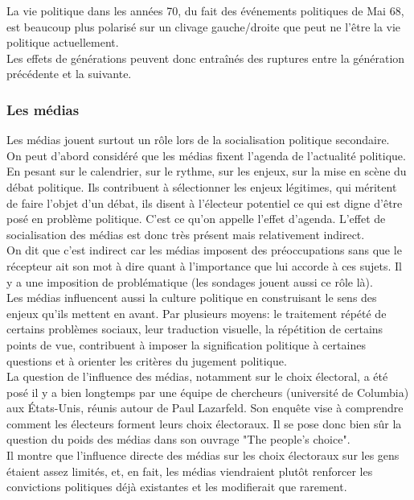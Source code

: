 \documentclass[12pt, a4paper, openany]{book}
\begin{document}
La vie politique dans les années 70, du fait des événements politiques de Mai 68, est beaucoup plus polarisé sur un clivage gauche/droite que peut ne l'être la vie politique actuellement. \\
Les effets de générations peuvent donc entraînés des ruptures entre la génération précédente et la suivante. 

\subsubsection{Les médias}

Les médias jouent surtout un rôle lors de la socialisation politique secondaire. \\
On peut d'abord considéré que les médias fixent l'agenda de l'actualité politique. En pesant sur le calendrier, sur le rythme, sur les enjeux, sur la mise en scène du débat politique. Ils contribuent à sélectionner les enjeux légitimes, qui méritent de faire l'objet d'un débat, ils disent à l'électeur potentiel ce qui est digne d'être posé en problème politique. C'est ce qu'on appelle l'effet d'agenda. L'effet de socialisation des médias est donc très présent mais relativement indirect. \\
On dit que c'est indirect car les médias imposent des préoccupations sans que le récepteur ait son mot à dire quant à l'importance que lui accorde à ces sujets. Il y a une imposition de problématique (les sondages jouent aussi ce rôle là). \\
Les médias influencent aussi la culture politique en construisant le sens des enjeux qu'ils mettent en avant. Par plusieurs moyens: le traitement répété de certains problèmes sociaux, leur traduction visuelle, la répétition de certains points de vue, contribuent à imposer la signification politique à certaines questions et à orienter les critères du jugement politique. \\
La question de l'influence des médias, notamment sur le choix électoral, a été posé il y a bien longtemps par une équipe de chercheurs (université de Columbia) aux États-Unis, réunis autour de Paul Lazarfeld. Son enquête vise à comprendre comment les électeurs forment leurs choix électoraux. Il se pose donc bien sûr la question du poids des médias dans son ouvrage "The people's choice". \\
Il montre que l'influence directe des médias sur les choix électoraux sur les gens étaient assez limités, et, en fait, les médias viendraient plutôt renforcer les convictions politiques déjà existantes et les modifierait que rarement. \\
\end{document}
